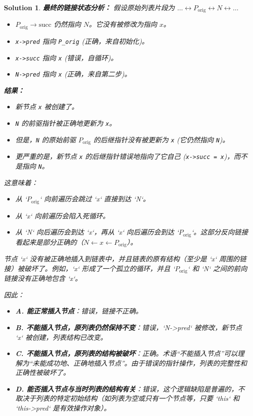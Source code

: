 \documentclass[UTF8]{report}
\newtheorem{solution}{Solution}
\theoremstyle{MyLineTheoremStyle} %
\theoremstyle{MyBlockTheoremStyle} %
\theoremstyle{MySubsubsectionStyle} %
\begin{document}
\begin{solution}
\textbf{最终的链接状态分析：}
假设原始列表片段为 $\ldots \leftrightarrow P_{\text{orig}} \leftrightarrow N \leftrightarrow \ldots$
\begin{itemize}
    \item $P_{\text{orig}} \rightarrow \text{succ}$ 仍然指向 $N$。它没有被修改为指向 $x$。
    \item \texttt{x->pred} 指向 \texttt{P\_orig} (正确，来自初始化)。
    \item \texttt{x->succ} 指向 \texttt{x} (错误，自循环)。
    \item \texttt{N->pred} 指向 \texttt{x} (正确，来自第二步)。
\end{itemize}

\textbf{结果：}
\begin{itemize}
    \item 新节点 \texttt{x} 被创建了。
    \item \texttt{N} 的前驱指针被正确地更新为 \texttt{x}。
    \item 但是，\texttt{N} 的原始前驱 $P_{\text{orig}}$ 的后继指针没有被更新为 \texttt{x} (它仍然指向 \texttt{N})。
    \item 更严重的是，新节点 \texttt{x} 的后继指针错误地指向了它自己 (\texttt{x->succ = x})，而不是指向 \texttt{N}。
\end{itemize}
这意味着：
\begin{itemize}
    \item 从 `$P_{\text{orig}}$` 向前遍历会跳过 `x` 直接到达 `N`。
    \item 从 `x` 向前遍历会陷入死循环。
    \item 从 `N` 向后遍历会到达 `x`，再从 `x` 向后遍历会到达 `$P_{\text{orig}}$`。这部分反向链接看起来是部分正确的（$N \leftarrow x \leftarrow P_{\text{orig}}$）。
\end{itemize}
节点 `x` 没有被正确地插入到链表中，并且链表的原有结构（至少是 `x` 周围的链接）被破坏了。例如，`x` 形成了一个孤立的循环，并且 `$P_{\text{orig}}$` 和 `N` 之间的前向链接没有正确地包含 `x`。

因此：
\begin{itemize}
    \item \textbf{A. 能正常插入节点}：错误，链接不正确。
    \item \textbf{B. 不能插入节点，原列表仍然保持不变}：错误，`N->pred` 被修改，新节点 `x` 被创建，列表结构已改变。
    \item \textbf{C. 不能插入节点，原列表的结构被破坏}：正确。术语“不能插入节点”可以理解为“未能成功地、正确地插入节点”。由于错误的指针操作，列表的完整性和正确性被破坏了。
    \item \textbf{D. 能否插入节点与当时列表的结构有关}：错误，这个逻辑缺陷是普遍的，不取决于列表的特定初始结构（如列表为空或只有一个节点等，只要 `this` 和 `this->pred` 是有效操作对象）。
\end{itemize}
\end{solution}
\end{document}

